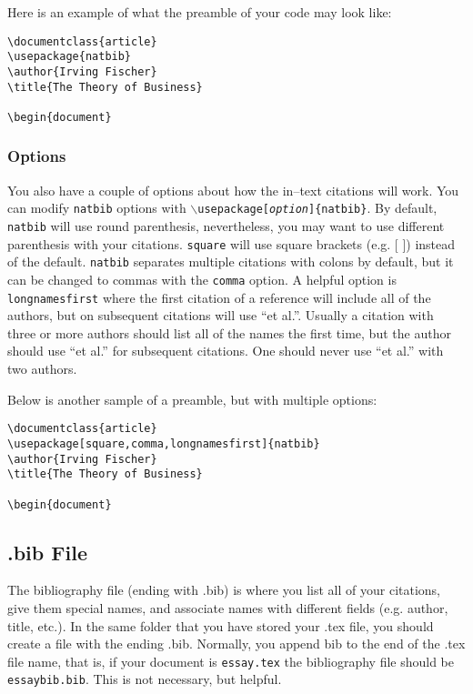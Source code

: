\documentclass{article}
\begin{document}
Here is an example of what the preamble of your code may look like:
\begin{verbatim}
\documentclass{article}
\usepackage{natbib}
\author{Irving Fischer}
\title{The Theory of Business}

\begin{document}
\end{verbatim}
\subsubsection{Options}

You also have a couple of options about how the in--text citations will work. You can modify \texttt{natbib} options with \texttt{$\backslash$usepackage[\textit{option}]\{natbib\}}. By default, \texttt{natbib} will use round parenthesis, nevertheless, you may want to use different parenthesis with your citations. \texttt{square} will use square brackets (e.g. [ ]) instead of the default. \texttt{natbib} separates multiple citations with colons by default, but it can be changed to commas with the \texttt{comma} option. A helpful option is \texttt{longnamesfirst} where the first citation of a reference will include all of the authors, but on subsequent citations will use ``et al.''. Usually a citation with three or more authors should list all of the names the first time, but the author should use ``et al.'' for subsequent citations. One should never use ``et al.'' with two authors.

Below is another sample of a preamble, but with multiple options:
\begin{verbatim}
\documentclass{article}
\usepackage[square,comma,longnamesfirst]{natbib}
\author{Irving Fischer}
\title{The Theory of Business}

\begin{document}
\end{verbatim}

\subsection{.bib File}

The bibliography file (ending with .bib) is where you list all of your citations, give them special names, and associate names with different fields (e.g. author, title, etc.). In the same folder that you have stored your .tex file, you should create a file with the ending .bib. Normally, you append bib to the end of the .tex file name, that is, if your document is \texttt{essay.tex} the bibliography file should be \texttt{essaybib.bib}. This is not necessary, but helpful.
\end{document}
